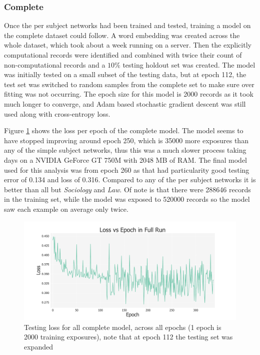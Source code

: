 \documentclass[12pt, a4paper]{article}
\begin{document}
\subsubsection{Complete}

Once the per subject networks had been trained and tested, training a model on the complete dataset could follow. A word embedding was created across the whole dataset, which took about a week running on a server. Then the explicitly computational records were identified and combined with twice their count of non-computational records and a $10\%$ testing holdout set was created. The model was initially tested on a small subset of the testing data, but at epoch 112, the test set was switched to random samples from the complete set to make sure over fitting was not occurring. The epoch size for this model is 2000 records as it took much longer to converge, and Adam based stochastic gradient descent was still used along with cross-entropy loss. 

Figure \ref{full_loss} shows the loss per epoch of the complete model. The model seems to have  stopped improving around epoch 250, which is \num{35000} more exposures than any of the simple subject networks, thus this was a much slower process taking days on a NVIDIA GeForce GT 750M with \num{2048} MB of RAM. The final model used for this analysis was from epoch 260 as that had particularity good testing error of \num{0.134} and loss of \num{0.316}. Compared to any of the per subject networks it is better than all but \textit{Sociology} and \textit{Law}. Of note is that there were \num{288646} records in the training set, while the model was exposed to \num{520000} records so the model saw each example on average only twice.


\begin{figure}[H]
	\centering
	\begin{adjustbox}{center}
		\includegraphics[width=1.3\textwidth]{full_loss}
	\end{adjustbox}
	\caption{Testing loss for all complete  model, across all epochs (1 epoch is 2000 training exposures), note that at epoch 112 the testing set was expanded}\label{full_loss}
\end{figure}
\end{document}
